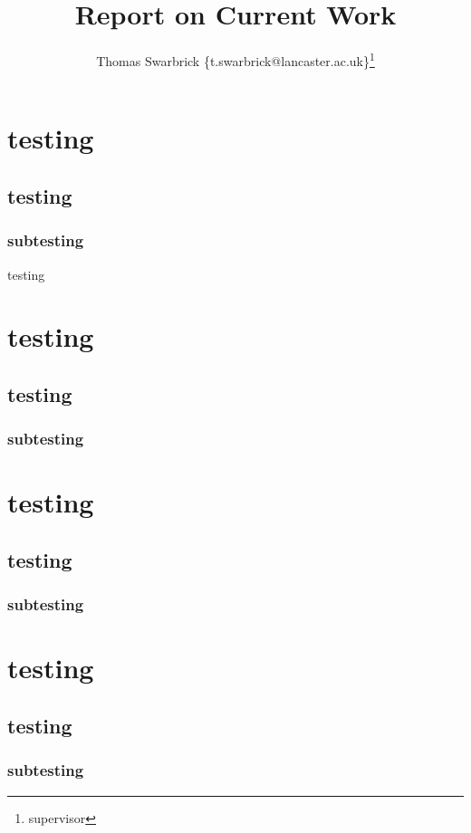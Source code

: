 \documentclass[]{scrreprt}
\title{Report on Current Work}
\author{Thomas Swarbrick \{t.swarbrick@lancaster.ac.uk\}\thanks{supervisor}}
\begin{document}
\maketitle

\chapter{testing}
\section{testing}
\subsection{subtesting}
testing\cite{bob123}

\chapter{testing}
\section{testing}
\subsection{subtesting}

\chapter{testing}
\section{testing}
\subsection{subtesting}

\chapter{testing}
\section{testing}
\subsection{subtesting}
\end{document}
